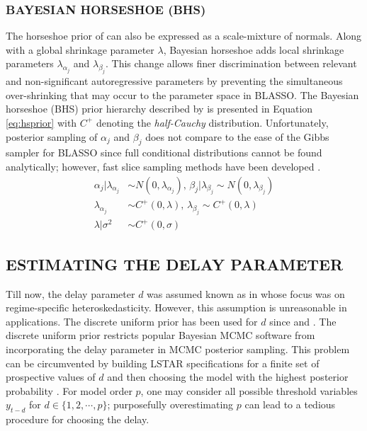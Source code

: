  \subsubsection{BAYESIAN HORSESHOE (BHS)}
 
The horseshoe prior  of \cite{Carvalho2009} can also be expressed as a scale-mixture of normals. Along with a global shrinkage parameter $\lambda$, Bayesian horseshoe adds local shrinkage parameters $\lambda_{\alpha_j}$ and $\lambda_{\beta_j}$. This change allows finer discrimination between relevant and non-significant autoregressive parameters by preventing the simultaneous over-shrinking that may occur to the parameter space in BLASSO. The  Bayesian horseshoe (BHS) prior hierarchy described by \citep{Carvalho2010} is presented in Equation \ref{eq:hsprior} with $C^+$ denoting the \textit{half-Cauchy} distribution. Unfortunately, posterior sampling of $\alpha_j$ and $\beta_j$ does not compare to the ease of the Gibbs sampler for BLASSO since full conditional distributions cannot be found analytically; however, fast slice sampling methods have been developed \citep{Makalic2016}.  
\begin{equation}
\begin{split}
	\label{eq:hsprior}
	\alpha_j|\lambda_{\alpha_j} & \sim N(0,\lambda_{\alpha_j}) \textrm{,  }  \beta_j|\lambda_{\beta_j} \sim N(0,\lambda_{\beta_j}) \\
	  \lambda_{\alpha_j} & \sim C^+(0,\lambda) \textrm{,  } \lambda_{\beta_j} \sim C^+(0,\lambda) \\
	  \lambda|\sigma^2 & \sim C^+(0,\sigma)
\end{split}
\end{equation}

\subsection{ESTIMATING THE DELAY PARAMETER}

Till now, the delay parameter $d$ was assumed known as in \cite{Gerlach2008} whose focus was on regime-specific heteroskedasticity. However, this assumption is unreasonable in applications. The discrete uniform prior has been used for $d$ since \cite{Lubrano2000} and \cite{Lopes2006}. The discrete uniform prior restricts popular Bayesian MCMC software from incorporating the delay parameter in MCMC posterior sampling. This problem can be circumvented by building LSTAR specifications for a finite set of prospective values of $d$ and then choosing the model with the highest posterior probability \citep{Deschamps2008}. For model order $p$, one may consider all possible threshold variables $y_{t-d}$ for $d \in \{1,2, \cdots, p\}$; purposefully overestimating $p$ can lead to a tedious procedure for choosing the delay. 

